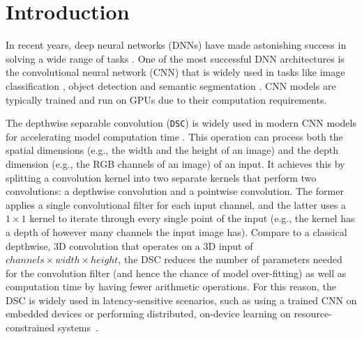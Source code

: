 \section{Introduction}

In recent years, deep neural networks (DNNs) have made astonishing success in solving a wide range of tasks \FIXME{\cite{}}. One of the
most successful DNN architectures is the convolutional neural network (CNN) that is widely used in tasks like image classification
\FIXME{\cite{}}, object detection \FIXME{\cite{}} and  semantic segmentation \FIXME{\cite{}}. CNN models are typically trained and run on
GPUs due to their computation requirements.


The depthwise separable convolution (\texttt{DSC}) is widely used in modern CNN models for accelerating model computation time
\FIXME{\cite{}}. This operation can process both the spatial dimensions (e.g., the width and the height of an image) and the depth
dimension (e.g., the RGB channels of an image) of an input. It achieves this by splitting a convolution kernel into two separate kernels
that perform two convolutions: a depthwise convolution and a pointwise convolution. The former applies a single convolutional filter for
each input channel, and the latter uses a $1 \times 1$ kernel to iterate through every single point of the input (e.g., the kernel has a
depth of however many channels the input image has). Compare to a classical depthwise, 3D convolution that operates on a 3D input of
$channels \times width \times height$, the DSC reduces the number of parameters needed for the convolution filter (and hence the chance of
model over-fitting) as well as computation time by having fewer arithmetic operations. For this reason, the DSC is widely used in
latency-sensitive scenarios, such as using a trained CNN on embedded devices or performing distributed, on-device learning on
resource-constrained systems~\cite{espeholt2019seed}.


